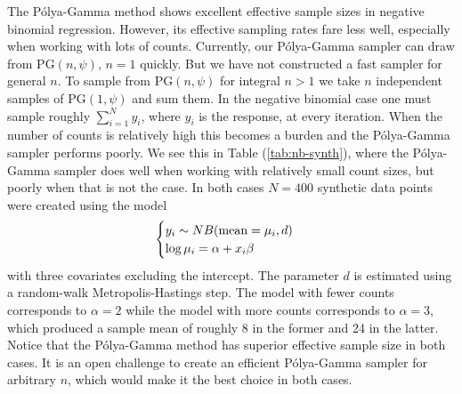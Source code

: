\documentclass{article}
\newcommand{\Polya}{P\'{o}lya}
\newcommand{\PG}{\text{PG}}
\begin{document}
The \Polya-Gamma method shows excellent effective sample sizes in negative
binomial regression.  However, its effective sampling rates fare less well,
especially when working with lots of counts.  Currently, our \Polya-Gamma
sampler can draw from $\PG(n, \psi)$, $n=1$ quickly.  But we have not
constructed a fast sampler for general $n$.  To sample from $\PG(n, \psi)$ for
integral $n > 1$ we take $n$ independent samples of $\PG(1, \psi)$ and sum them.
In the negative binomial case one must sample roughly $\sum_{i=1}^N y_i$, where
$y_i$ is the response, at every iteration.  When the number of counts is
relatively high this becomes a burden and the \Polya-Gamma sampler performs
poorly.  We see this in Table (\ref{tab:nb-synth}), where the \Polya-Gamma
sampler does well when working with relatively small count sizes, but poorly
when that is not the case.  In both cases $N=400$ synthetic data points were
created using the model
\[
\begin{cases}
y_i \sim NB(\textmd{mean}=\mu_i, d) \\
\log \mu_i = \alpha + x_i \beta
\end{cases}
\]
with three covariates excluding the intercept.  The parameter $d$ is estimated
using a random-walk Metropolis-Hastings step.  The model with fewer counts
corresponds to $\alpha = 2$ while the model with more counts corresponds to
$\alpha = 3$, which produced a sample mean of roughly 8 in the former and 24 in
the latter.  Notice that the \Polya-Gamma method has superior effective sample
size in both cases.  It is an open challenge to create an efficient \Polya-Gamma
sampler for arbitrary $n$, which would make it the best choice in both cases.
\end{document}
